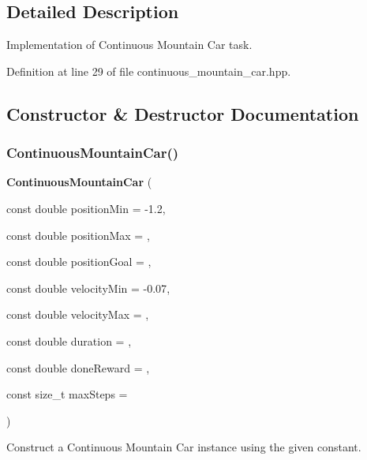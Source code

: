 \subsection{Detailed Description}
Implementation of Continuous Mountain Car task. 

Definition at line 29 of file continuous\+\_\+mountain\+\_\+car.\+hpp.



\subsection{Constructor \& Destructor Documentation}
\mbox{\label{classmlpack_1_1rl_1_1ContinuousMountainCar_a568490dd26015df07bfc437305d7353f}} 
\subsubsection{Continuous\+Mountain\+Car()}
{\footnotesize\ttfamily \textbf{ Continuous\+Mountain\+Car} (\begin{DoxyParamCaption}\item[{const double}]{position\+Min = {\ttfamily -\/1.2},  }\item[{const double}]{position\+Max = {},  }\item[{const double}]{position\+Goal = {},  }\item[{const double}]{velocity\+Min = {\ttfamily -\/0.07},  }\item[{const double}]{velocity\+Max = {},  }\item[{const double}]{duration = {},  }\item[{const double}]{done\+Reward = {},  }\item[{const size\+\_\+t}]{max\+Steps = {} }\end{DoxyParamCaption})\hspace{0.3cm}{\ttfamily [inline]}}



Construct a Continuous Mountain Car instance using the given constant. 


